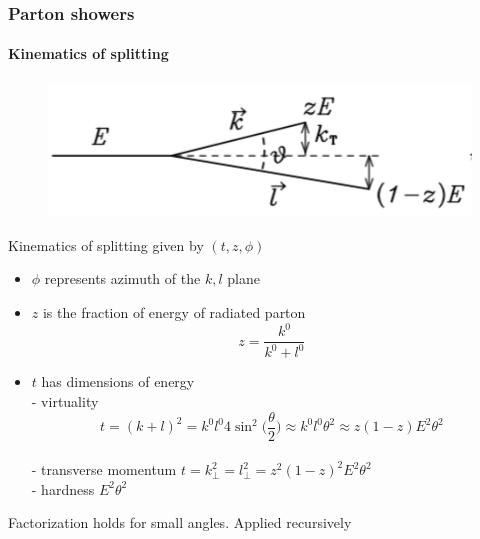 \documentclass[aspectratio=43]{beamer}
\begin{document}
\begin{frame}

	\frametitle{Parton showers}
	\framesubtitle{Kinematics of splitting}
	
	\begin{figure}
		\includegraphics[width = 5 cm]{plots/shower_kinematics.png}
	\end{figure}
	
	\footnotesize Kinematics of splitting given by $(t, z, \phi)$
	\begin{itemize}
		\item $\phi$ represents azimuth of the $k, l$ plane
		\item $z$ is the fraction of energy of radiated parton $$z = \frac{k^{0}}{k^{0} + l^{0}}$$
		\item $t$ has dimensions of energy \\
			- virtuality $$t = (k + l)^{2} = k^{0}l^{0}4\sin^{2}\bigg( \frac{\theta}{2} \bigg) \approx k^{0}l^{0}\theta^{2} \approx z(1 - z)E^{2}\theta^{2}$$ \\
			- transverse momentum $t = k_{\perp}^{2} = l_{\perp}^{2} = z^{2}(1 - z)^{2}E^{2}\theta^{2}$ \\
			- hardness $E^{2}\theta^{2}$ \\
	\end{itemize}
	
	\vspace{0.5cm}
	
	Factorization holds for small angles. Applied recursively
	
\end{frame}
\end{document}
